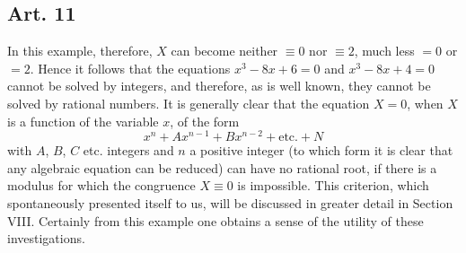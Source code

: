 \documentclass{book}
\theoremstyle{plain}
\begin{document}
\subsection*{Art. 11}

In this example, therefore, $X$ can become neither $\equiv 0$ nor $\equiv 2$, much less $=0$ or $=2$. Hence it follows  that the equations $x^3 -8x + 6 = 0$ and $x^3 - 8x + 4 =0$ cannot be solved by integers, and therefore, as is well known, they cannot be solved by rational numbers.   It is generally clear that the equation $X=0$, when $X$ is a function of the variable $x$, of the form
\[ x^n + Ax^{n-1} + Bx^{n-2} + \textrm{etc.} + N \]
with $A$, $B$, $C$ etc. integers and $n$ a positive integer (to which form it is clear that any algebraic equation can be reduced) can have no rational root, if there is a modulus for which the congruence $X\equiv0$ is impossible.  This criterion, which spontaneously presented itself to us, will be discussed in greater detail in Section VIII.  Certainly from this example one obtains a sense of the utility of these investigations.
\end{document}
